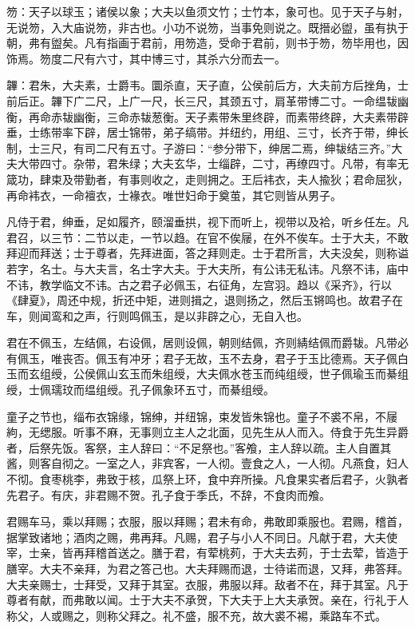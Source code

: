 \documentclass[]{article}
\begin{document}
笏：天子以球玉；诸侯以象；大夫以鱼须文竹；士竹本，象可也。见于天子与射，无说笏，入大庙说笏，非古也。小功不说笏，当事免则说之。既搢必盥，虽有执于朝，弗有盥矣。凡有指画于君前，用笏造，受命于君前，则书于笏，笏毕用也，因饰焉。笏度二尺有六寸，其中博三寸，其杀六分而去一。

韠：君朱，大夫素，士爵韦。圜杀直，天子直，公侯前后方，大夫前方后挫角，士前后正。韠下广二尺，上广一尺，长三尺，其颈五寸，肩革带博二寸。一命缊韨幽衡，再命赤韨幽衡，三命赤韨葱衡。天子素带朱里终辟，而素带终辟，大夫素带辟垂，士练带率下辟，居士锦带，弟子缟带。并纽约，用组、三寸，长齐于带，绅长制，士三尺，有司二尺有五寸。子游曰：``参分带下，绅居二焉，绅韨结三齐。''大夫大带四寸。杂带，君朱绿；大夫玄华，士缁辟，二寸，再缭四寸。凡带，有率无箴功，肆束及带勤者，有事则收之，走则拥之。王后袆衣，夫人揄狄；君命屈狄，再命袆衣，一命襢衣，士褖衣。唯世妇命于奠茧，其它则皆从男子。

凡侍于君，绅垂，足如履齐，颐溜垂拱，视下而听上，视带以及袷，听乡任左。凡君召，以三节：二节以走，一节以趋。在官不俟屦，在外不俟车。士于大夫，不敢拜迎而拜送；士于尊者，先拜进面，答之拜则走。士于君所言，大夫没矣，则称谥若字，名士。与大夫言，名士字大夫。于大夫所，有公讳无私讳。凡祭不讳，庙中不讳，教学临文不讳。古之君子必佩玉，右征角，左宫羽。趋以《采齐》，行以《肆夏》，周还中规，折还中矩，进则揖之，退则扬之，然后玉锵鸣也。故君子在车，则闻鸾和之声，行则鸣佩玉，是以非辟之心，无自入也。

君在不佩玉，左结佩，右设佩，居则设佩，朝则结佩，齐则綪结佩而爵韨。凡带必有佩玉，唯丧否。佩玉有冲牙；君子无故，玉不去身，君子于玉比德焉。天子佩白玉而玄组绶，公侯佩山玄玉而朱组绶，大夫佩水苍玉而纯组绶，世子佩瑜玉而綦组绶，士佩瓀玟而缊组绶。孔子佩象环五寸，而綦组绶。

童子之节也，缁布衣锦缘，锦绅，并纽锦，束发皆朱锦也。童子不裘不帛，不屦絇，无缌服。听事不麻，无事则立主人之北面，见先生从人而入。侍食于先生异爵者，后祭先饭。客祭，主人辞曰：``不足祭也。''客飧，主人辞以疏。主人自置其酱，则客自彻之。一室之人，非宾客，一人彻。壹食之人，一人彻。凡燕食，妇人不彻。食枣桃李，弗致于核，瓜祭上环，食中弃所操。凡食果实者后君子，火孰者先君子。有庆，非君赐不贺。孔子食于季氏，不辞，不食肉而飧。

君赐车马，乘以拜赐；衣服，服以拜赐；君未有命，弗敢即乘服也。君赐，稽首，据掌致诸地；酒肉之赐，弗再拜。凡赐，君子与小人不同日。凡献于君，大夫使宰，士亲，皆再拜稽首送之。膳于君，有荤桃茢，于大夫去茢，于士去荤，皆造于膳宰。大夫不亲拜，为君之答己也。大夫拜赐而退，士待诺而退，又拜，弗答拜。大夫亲赐士，士拜受，又拜于其室。衣服，弗服以拜。敌者不在，拜于其室。凡于尊者有献，而弗敢以闻。士于大夫不承贺，下大夫于上大夫承贺。亲在，行礼于人称父，人或赐之，则称父拜之。礼不盛，服不充，故大裘不裼，乘路车不式。
\end{document}

